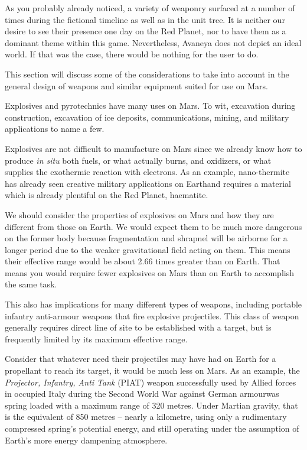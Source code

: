 

As you probably already noticed, a variety of weaponry surfaced at a number of times during the fictional timeline as well as in the unit tree. It is neither our desire to see their presence one day on the Red Planet, nor to have them as a dominant theme within this game. Nevertheless, Avaneya does not depict an ideal world. If that was the case, there would be nothing for the user to do. 

This section will discuss some of the considerations to take into account in the general design of weapons and similar equipment suited for use on Mars.


Explosives and pyrotechnics have many uses on Mars. To wit, excavation during construction, excavation of ice deposits, communications, mining, and military applications to name a few.

Explosives are not difficult to manufacture on Mars since we already know how to produce {\it in situ} both fuels, or what actually burns, and oxidizers, or what supplies the exothermic reaction with electrons. As an example, nano-thermite has already seen creative military applications on Earth\footnotecite[harrit2009] and requires a material which is already plentiful on the Red Planet, haematite.

We should consider the properties of explosives on Mars and how they are different from those on Earth. We would expect them to be much more dangerous on the former body because fragmentation and shrapnel will be airborne for a longer period due to the weaker gravitational field acting on them. This means their effective range would be about 2.66 times greater than on Earth. That means you would require fewer explosives on Mars than on Earth to accomplish the same task.

This also has implications for many different types of weapons, including portable infantry anti-armour weapons that fire explosive projectiles. This class of weapon generally requires direct line of site to be established with a target, but is frequently limited by its maximum effective range. 

Consider that whatever need their projectiles may have had on Earth for a propellant to reach its target, it would be much less on Mars. As an example, the {\it Projector, Infantry, Anti Tank} (PIAT) weapon successfully used by Allied forces in occupied Italy during the Second World War against German armour\footnotecite[extras={ p.~351.}][roy1965] was spring loaded with a maximum range of 320 metres. Under Martian gravity, that is the equivalent of 850 metres -- nearly a kilometre, using only a rudimentary compressed spring's potential energy, and still operating under the assumption of Earth's more energy dampening atmosphere.

